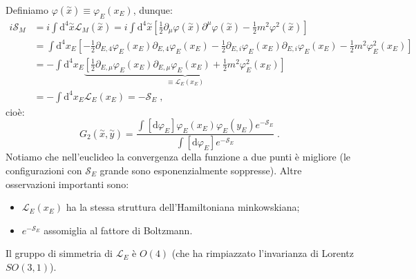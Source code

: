 \documentclass[12pt,a4paper]{article}
\theoremstyle{definition}
\newcommand{\lag}{\mathcal{L}}
\newcommand{\diff}[1][]{\mathrm{d}#1}
\numberwithin{equation}{section}
\begin{document}
Definiamo $\varphi(\stackrel{\sim}{x})\equiv \varphi_E(x_E)$, dunque:
\begin{align*}
i\mathcal{S}_M &= i\int\diff^4{\stackrel{\sim}{x}}\lag_M(\stackrel{\sim}{x})=i\int\diff^4{\stackrel{\sim}{x}}\left[\frac{1}{2}\partial_{\mu}\varphi(\stackrel{\sim}{x})\partial^{\mu}\varphi(\stackrel{\sim}{x})-\frac{1}{2}m^2\varphi^2(\stackrel{\sim}{x})\right] \\
&=\int\diff^4{x_E}\left[-\frac{1}{2}\partial_{E,4}\varphi_E(x_E)\partial_{E,4}\varphi_E(x_E)-\frac{1}{2}\partial_{E,i}\varphi_E(x_E)\partial_{E,i}\varphi_E(x_E)-\frac{1}{2}m^2\varphi_E^2(x_E)\right] \\
&= -\int\diff^4{x_E}\underbrace{\left[\frac{1}{2}\partial_{E,\mu}\varphi_E(x_E)\partial_{E,\mu}\varphi_E(x_E)+\frac{1}{2}m^2\varphi^2_E(x_E)\right]}_{\equiv \lag_E(x_E)} \\
&= -\int\diff^4{x_E}\lag_E(x_E)=-\mathcal{S}_E\;,
\end{align*}
cioè:
\begin{equation}
G_2(\stackrel{\sim}{x},\stackrel{\sim}{y})=\frac{\int[\diff{\varphi_E}]\varphi_E(x_E)\varphi_E(y_E)e^{-\mathcal{S}_E}}{\int[\diff{\varphi_E}]e^{-\mathcal{S}_E}}\;.
\end{equation}
Notiamo che nell'euclideo la convergenza della funzione a due punti è migliore (le configurazioni con $\mathcal{S}_E$ grande sono esponenzialmente soppresse). Altre osservazioni importanti sono:
\begin{itemize}
\item $\lag_E(x_E)$ ha la stessa struttura dell'Hamiltoniana minkowskiana;
\item $e^{-\mathcal{S}_E}$ assomiglia al fattore di Boltzmann.
\end{itemize}
Il gruppo di simmetria di $\lag_E$ è $O(4)$ (che ha rimpiazzato l'invarianza di Lorentz $SO(3,1)$).
\end{document}
